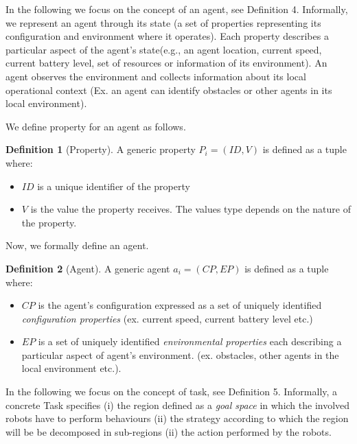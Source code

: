 \documentclass[journal]{IEEEtran}
\theoremstyle{definition}
\newtheorem{definition}{Definition}
\newcommand\patrizio[1]{\nb{Patrizio}{#1}}
\newcommand\ivano[1]{\nb{Ivano}{#1}}
\begin{document}
In  the  following  we  focus  on  the  concept  of  an agent,  see Definition 4. 
Informally, we represent an agent through its state (a set of  properties representing its configuration %
and environment where it operates). Each property describes a particular aspect of the agent's state(e.g., an agent location, current speed, current battery level, set of resources or information of its  environment). An agent observes the environment and collects information about its local operational context (Ex. an agent can identify obstacles or other agents in its local environment).

We define property for an agent as follows.

\begin{definition}[Property]
A generic property $P_i=(ID, V)$ is defined as a tuple where:
\begin{itemize}
\item $ID$ is a unique identifier of the property
\item $V$ is the value the property receives. The values type depends on the nature of the property.
\end{itemize}
\end{definition}

Now, we  formally define an agent. 

\begin{definition}[Agent]
A generic agent $a_i=(CP, EP)$ is defined as a tuple %
where:
\begin{itemize}
\item $CP$ is the agent's configuration expressed as a set of uniquely identified \textit{configuration properties} (ex. current speed, current battery level etc.)
\item $EP$ is a set of uniquely identified \textit{environmental properties} each describing a particular aspect of agent's environment. (ex. obstacles, other agents in the local environment etc.). 
\end{itemize}
\end{definition}

In the following we focus on the concept of task, see Definition
5. Informally, a concrete Task specifies (i) 
the region defined as a \textit{goal space} in which the involved robots have to perform behaviours 
(ii) the strategy according to which the region will be be  decomposed  in sub-regions 
(ii) the action performed by the robots.
\end{document}
